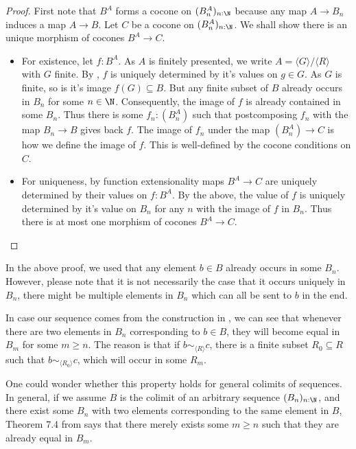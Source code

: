 \begin{proof}
  First note that $B^A$ forms a cocone on $(B_n^A)_{n:\N}$ 
  because any map $A \to B_n$ induces a map $A \to B$. 
  Let $C$ be a cocone on $(B_n^A)_{n:\N}$. 
  We shall show there is an unique morphism of cocones $B^A \to C$. 
  \begin{itemize}
    \item For existence, let $f:B^A$. 
      As $A$ is finitely presented, we write $A = \langle G \rangle / \langle R \rangle$ with $G$ finite.
      By , $f$ is uniquely determined by it's values on $g\in G$. 
      As $G$ is finite, so is it's image $f(G)\subseteq B$. 
      But any finite subset of $B$ already occurs in $B_n$ for some $n\in\N$. 
      Consequently, the image of $f$ is already contained in some $B_n$. 
      Thus there is some $f_n:(B_n^A)$ such that postcomposing 
      $f_n$ with the map $B_n \to B$ gives back $f$. 
      The image of $f_n$ under the map $(B_n^A) \to C$ is how we define the image of $f$. 
      This is well-defined by the cocone conditions on $C$. 
    \item 
      For uniqueness, by function extensionality maps $B^A \to C$ are uniquely determined by their values on 
      $f:B^A$. By the above, the value of $f$ is uniquely determined by it's value on $B_n$ for 
      any $n$ with the image of $f$ in $B_n$. Thus there is at most one morphism of cocones $B^A \to C$. 
  \end{itemize}
\end{proof}
\begin{remark}\label{rmkEqualityColimit}
  In the above proof, we used that any element $b\in B$ already occurs in some $B_n$. 
  However, please note that it is not necessarily the case that it occurs uniquely in $B_n$, 
  there might be multiple elements in $B_n$ which can all be sent to $b$ in the end. 

  In case our sequence comes from the construction in , 
  we can see that whenever there are two elements in 
  $B_n$ corresponding to $b\in B$, they will become equal in $B_m$ for some $m\geq n$. 
  The reason is that if $b \sim_{\langle R \rangle} c$, there is a finite subset $R_0 \subseteq R$ such that 
  $b\sim_{\langle R_0 \rangle} c$, which will occur in some $R_m$. 

  One could wonder whether this property holds for general colimits of sequences. 
  In general, if we assume $B$ is the colimit of an arbitrary sequence $(B_n)_{n:\N}$, 
  and there exist some $B_n$ with two elements corresponding to the same element in $B$, 
  Theorem 7.4 from \cite{SequentialColimitHoTT} says that there merely exists some $m\geq n$
  such that they are already equal in $B_m$. 
\end{remark}

